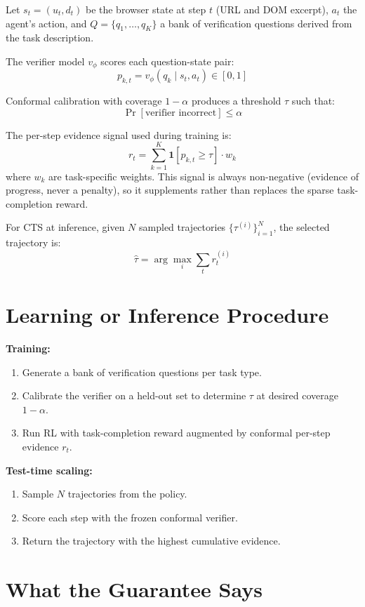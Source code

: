 \documentclass[10pt,twocolumn]{article}
\begin{document}
Let $s_t = (u_t, d_t)$ be the browser state at step $t$ (URL and DOM excerpt),
$a_t$ the agent's action, and $Q = \{q_1, \ldots, q_K\}$ a bank of
verification questions derived from the task description.

The verifier model $v_\phi$ scores each question-state pair:
\[
p_{k,t} = v_\phi(q_k \mid s_t, a_t) \in [0, 1]
\]

Conformal calibration with coverage $1 - \alpha$ produces a threshold $\tau$
such that:
\[
\Pr[\text{verifier incorrect}] \leq \alpha
\]

The per-step evidence signal used during training is:
\[
r_t = \sum_{k=1}^{K} \mathbf{1}[p_{k,t} \geq \tau] \cdot w_k
\]
where $w_k$ are task-specific weights. This signal is always non-negative
(evidence of progress, never a penalty), so it supplements rather than
replaces the sparse task-completion reward.

For CTS at inference, given $N$ sampled trajectories
$\{\tau^{(i)}\}_{i=1}^N$, the selected trajectory is:
\[
\hat{\tau} = \arg\max_i \sum_t r_t^{(i)}
\]

\section{Learning or Inference Procedure}

\textbf{Training:}
\begin{enumerate}[itemsep=2pt,parsep=0pt]
  \item Generate a bank of verification questions per task type.
  \item Calibrate the verifier on a held-out set to determine $\tau$
    at desired coverage $1 - \alpha$.
  \item Run RL with task-completion reward augmented by conformal
    per-step evidence $r_t$.
\end{enumerate}

\textbf{Test-time scaling:}
\begin{enumerate}[itemsep=2pt,parsep=0pt]
  \item Sample $N$ trajectories from the policy.
  \item Score each step with the frozen conformal verifier.
  \item Return the trajectory with the highest cumulative evidence.
\end{enumerate}

\section{What the Guarantee Says}
\end{document}
